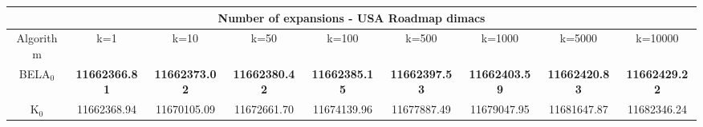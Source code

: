\begin{tabular}{c|cccccccc}\toprule
\multicolumn{9}{c}{Number of expansions - USA Roadmap dimacs}\\ \midrule
Algorithm & k=1 & k=10 & k=50 & k=100 & k=500 & k=1000 & k=5000 & k=10000 \\ \midrule
BELA$_0$ & \textbf{11662366.81} & \textbf{11662373.02} & \textbf{11662380.42} & \textbf{11662385.15} & \textbf{11662397.53} & \textbf{11662403.59} & \textbf{11662420.83} & \textbf{11662429.22} \\
K$_0$ & 11662368.94 & 11670105.09 & 11672661.70 & 11674139.96 & 11677887.49 & 11679047.95 & 11681647.87 & 11682346.24 \\ \bottomrule 
\end{tabular}
